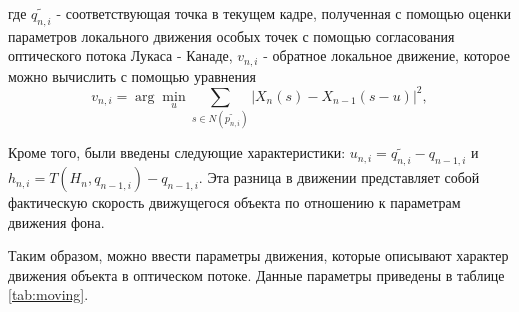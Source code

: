 где $\tilde{q_{n, i}}$ - соответствующая точка в текущем кадре, полученная с помощью оценки параметров локального движения особых точек с помощью согласования оптического потока Лукаса - Канаде, $v_{n, i}$ - обратное локальное движение, которое можно вычислить с помощью уравнения 
\begin{equation}
v_{n, i}=\arg \min _u \sum_{s \in N\left(\widetilde{p_{n, i}}\right)}\left|X_n(s)-X_{n-1}(s-u)\right|^2,
\end{equation}

Кроме того, были введены следующие характеристики: $u_{n, i}=\tilde{q_{n, i}}-q_{n-1, i}$ и $h_{n, i}=T\left(H_n, q_{n-1, i}\right)-q_{n-1, i}$. Эта разница в движении представляет собой фактическую скорость движущегося объекта по отношению к параметрам движения фона.

Таким образом, можно ввести параметры движения, которые описывают характер движения объекта в оптическом потоке. Данные параметры приведены в таблице \ref{tab:moving}.

